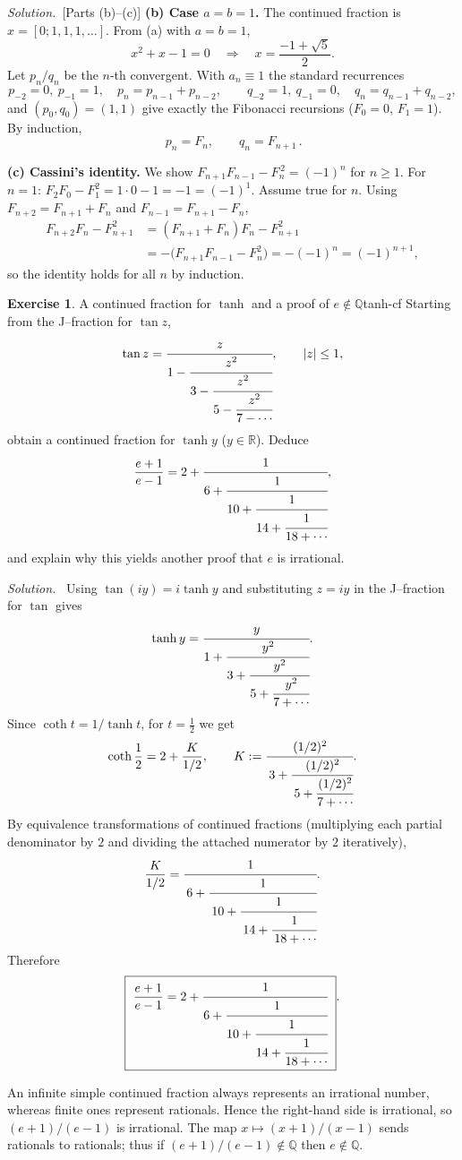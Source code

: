 \documentclass[11pt,a4paper]{article}
\theoremstyle{definition}
\newtheorem{exercise}{Exercise} %
\theoremstyle{definition}
\theoremstyle{plain}
\theoremstyle{remark}
\newenvironment{solution}{\par\noindent\textit{Solution.}\ }{\par\vspace{0.5em}}
\begin{document}
\begin{solution}[Parts (b)–(c)]
	\textbf{(b) Case $a=b=1$.}
	The continued fraction is $x=[0;1,1,1,\ldots]$. From (a) with $a=b=1$,
	\[
	x^2+x-1=0 \quad\Rightarrow\quad x=\frac{-1+\sqrt5}{2}.
	\]
	Let $p_n/q_n$ be the $n$-th convergent. With $a_n\equiv1$ the standard recurrences
	\[
	p_{-2}=0,\ p_{-1}=1,\quad p_n=p_{n-1}+p_{n-2},\qquad
	q_{-2}=1,\ q_{-1}=0,\quad q_n=q_{n-1}+q_{n-2},
	\]
	and $(p_0,q_0)=(1,1)$ give exactly the Fibonacci recursions
	($F_0=0$, $F_1=1$). By induction,
	\[
	\boxed{\,p_n=F_n,\qquad q_n=F_{n+1}\,}.
	\]
	
	\medskip
	\textbf{(c) Cassini’s identity.}
	We show $F_{n+1}F_{n-1}-F_n^{\,2}=(-1)^n$ for $n\ge1$.
	For $n=1$: $F_2F_0-F_1^2=1\cdot0-1=-1=(-1)^1$.
	Assume true for $n$. Using $F_{n+2}=F_{n+1}+F_n$ and $F_{n-1}=F_{n+1}-F_n$,
	\[
	\begin{aligned}
		F_{n+2}F_n - F_{n+1}^2
		&=(F_{n+1}+F_n)F_n - F_{n+1}^2\\
		&= -\bigl(F_{n+1}F_{n-1}-F_n^2\bigr)
		= -(-1)^n = (-1)^{n+1},
	\end{aligned}
	\]
	so the identity holds for all $n$ by induction.
\end{solution}

\begin{exercise}{A continued fraction for $\tanh$ and a proof of $e\notin\mathbb Q$}{tanh-cf}
	Starting from the J–fraction for $\tan z$,
	\[
	\tan z=\cfrac{z}{\displaystyle 1-\cfrac{z^{2}}{\displaystyle 3-\cfrac{z^{2}}{\displaystyle 5-\cfrac{z^{2}}{7-\cdots}}}},\qquad |z|\le1,
	\]
	obtain a continued fraction for $\tanh y$ ($y\in\mathbb R$). Deduce
	\[
	\frac{e+1}{e-1}
	=2+\cfrac{1}{\displaystyle 6+\cfrac{1}{\displaystyle 10+\cfrac{1}{\displaystyle 14+\cfrac{1}{\displaystyle 18+\cdots}}}},
	\]
	and explain why this yields another proof that $e$ is irrational.
\end{exercise}

\begin{solution}
	Using $\tan(i y)=i\tanh y$ and substituting $z=iy$ in the J–fraction for $\tan$ gives
	\[
	\tanh y
	=\cfrac{y}{\displaystyle 1+\cfrac{y^{2}}{\displaystyle 3+\cfrac{y^{2}}{\displaystyle 5+\cfrac{y^{2}}{7+\cdots}}}}.
	\]
	Since $\coth t=1/\tanh t$, for $t=\tfrac12$ we get
	\[
	\coth\frac12
	= 2+\frac{K}{1/2},\qquad
	K:=\cfrac{(1/2)^{2}}{\,3+\cfrac{(1/2)^{2}}{\,5+\cfrac{(1/2)^{2}}{7+\cdots}}}.
	\]
	By equivalence transformations of continued fractions (multiplying each partial
	denominator by $2$ and dividing the attached numerator by $2$ iteratively),
	\[
	\frac{K}{1/2}
	=\cfrac{1}{\,6+\cfrac{1}{\,10+\cfrac{1}{\,14+\cfrac{1}{\,18+\cdots}}}}.
	\]
	Therefore
	\[
	\boxed{\ \frac{e+1}{e-1}
		= 2+\cfrac{1}{\displaystyle 6+\cfrac{1}{\displaystyle 10+\cfrac{1}{\displaystyle 14+\cfrac{1}{\displaystyle 18+\cdots}}}}\ }.
	\]
	
	An infinite simple continued fraction always represents an irrational number,
	whereas finite ones represent rationals. Hence the right-hand side is irrational,
	so $(e+1)/(e-1)$ is irrational. The map $x\mapsto (x+1)/(x-1)$ sends rationals
	to rationals; thus if $(e+1)/(e-1)\notin\mathbb Q$ then $e\notin\mathbb Q$.
\end{solution}
\end{document}
